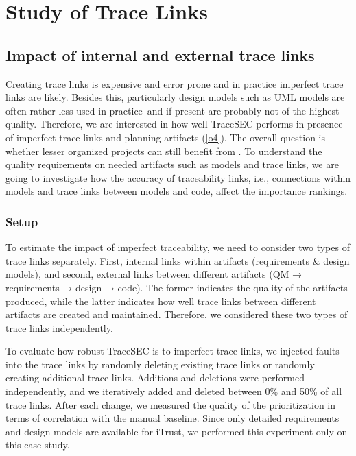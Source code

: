 \section{Study of Trace Links}
\label{sec:approach}

\subsection{Impact of internal and external trace links}

	Creating trace links is expensive and error prone and in practice imperfect trace links are likely.
	Besides this, particularly design models such as UML models are often rather less used in practice\,\citep{Gorschek2014} and if present are probably not of the highest quality.
	Therefore, we are interested in how well TraceSEC performs in presence of imperfect trace links and planning artifacts (\ref{o4}).
	The overall question is whether lesser organized projects can still benefit from \appr{}.
	To understand the quality requirements on needed artifacts such as models and trace links, we are going to investigate how the accuracy of traceability links, i.e., connections within models and trace links between models and code, affect the importance rankings.

\subsubsection{Setup}
	To estimate the impact of imperfect traceability, we need to consider two types of trace links separately.
	First, internal links within artifacts (requirements \& design models), and second, external links between different artifacts (QM → requirements → design → code).
	The former indicates the quality of the artifacts produced, while the latter indicates how well trace links between different artifacts are created and maintained.
	Therefore, we considered these two types of trace links independently.



	To evaluate how robust TraceSEC is to imperfect trace links, we injected faults into the trace links by randomly deleting existing trace links or randomly creating additional trace links.
	Additions and deletions were performed independently, and we iteratively added and deleted between 0\% and 50\% of all trace links.
	After each change, we measured the quality of the prioritization in terms of correlation with the manual baseline.
	Since only detailed requirements and design models are available for iTrust, we performed this experiment only on this case study.



